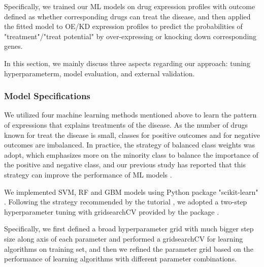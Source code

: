     Specifically, we trained our ML models on drug expression profiles with outcome defined as whether corresponding drugs can treat the disease, and then applied the fitted model to OE/KD expression profiles to predict the probabilities of "treatment"/"treat potential" by over-expressing or knocking down corresponding genes.

    In this section, we mainly discuss three aspects regarding our approach: tuning hyperparameterm, model evaluation, and external validation.

    \subsubsection{Model Specifications}
      We utilized four machine learning methods mentioned above to learn the pattern of expressions that explains treatments of the disease. As the number of drugs known for treat the disease is small, classes for positive outcomes and for negative outcomes are imbalanced. In practice, the strategy of balanced class weights was adopt, which emphasizes more on the minority class to balance the importance of the positive and negative class,  and our previous study has reported that this strategy can improve the performance of ML models \cite{zhao2018drug}. 
      
      We implemented SVM, RF and GBM models using Python package "scikit-learn" \cite{pedregosa2011scikit}. Following the strategy recommended by the tutorial \cite{hsu2003practical}, we adopted a two-step hyperparameter tuning with gridsearchCV provided by the package \cite{pedregosa2011scikit}. 
      
      Specifically, we first defined a broad hyperparameter grid with much bigger step size along axis of each parameter and performed a gridsearchCV for learning algorithms on training set, and then we refined the parameter grid based on the performance of learning algorithms with different parameter combinations. 
   
